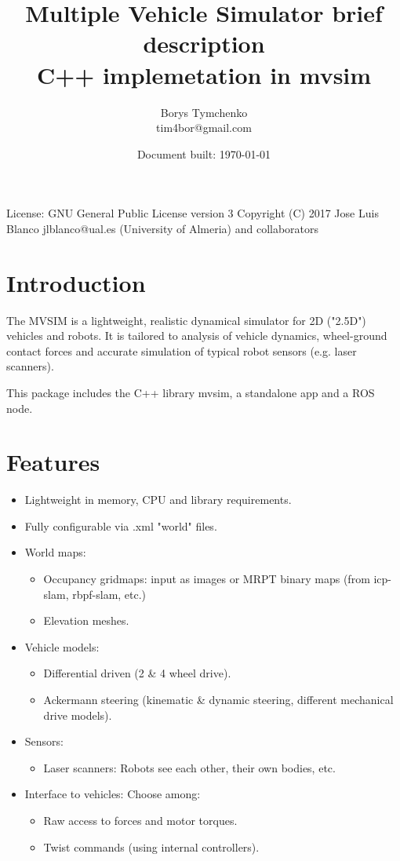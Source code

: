 \documentclass[a4paper,11pt]{article}
\title{Multiple Vehicle Simulator brief description \\ C++ implemetation in mvsim}
\author{Borys Tymchenko \\ tim4bor@gmail.com}
\date{Document built: \today}
\begin{document}
\maketitle
\vfill
\begin{center}
License: GNU General Public License version 3 Copyright (C) 2017 Jose Luis Blanco jlblanco@ual.es (University of Almeria) and collaborators
\end{center}

\newpage
\tableofcontents
\newpage

\section{Introduction}

The MVSIM is a lightweight, realistic dynamical simulator for 2D ("2.5D") vehicles and robots. It is tailored to analysis of vehicle dynamics, wheel-ground contact forces and accurate simulation of typical robot sensors (e.g. laser scanners).

This package includes the C++ library mvsim, a standalone app and a ROS node.

\newpage

\section{Features}
\begin{itemize}

\item Lightweight in memory, CPU and library requirements.
\item Fully configurable via .xml "world" files.
\item World maps:
	\begin{itemize}	
		\item Occupancy gridmaps: input as images or MRPT binary maps (from icp-slam, rbpf-slam, etc.)
		\item Elevation meshes.
	\end{itemize}	 
\item Vehicle models:
	\begin{itemize}
		\item Differential driven (2 \& 4 wheel drive).
		\item Ackermann steering (kinematic \& dynamic steering, different mechanical drive models).
	\end{itemize}
\item Sensors:
	\begin{itemize}
		\item Laser scanners: Robots see each other, their own bodies, etc.
	\end{itemize} 
\item Interface to vehicles: Choose among:
	\begin{itemize}
		\item Raw access to forces and motor torques.
		\item Twist commands (using internal controllers).
	\end{itemize}

\end{itemize}
\end{document}
